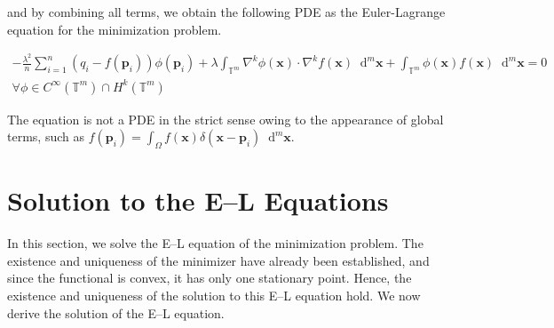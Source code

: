 \documentclass[multixcb]{amstext-l}
\theoremstyle{plain}
\theoremstyle{definition}
\theoremstyle{definition}
\theoremstyle{remark}
\numberwithin{equation}{chapter}
\begin{document}
and by combining all terms, we obtain the following PDE as the Euler-Lagrange equation for the minimization problem.

\begin{equation}\label{eq12}
\begin{aligned}
-\frac{\lambda^2}{n}\sum\limits_{i = 1}^{n}(q_i-f(\boldsymbol{p}_i))\phi(\boldsymbol{p}_i) + \lambda\int_{\mathbb{T}^m}\nabla^k\phi(\boldsymbol{x})\cdot \nabla^k f(\boldsymbol{x}) \mathop{}\!\mathrm{d}^m\boldsymbol{x}+  \int_{\mathbb{T}^m} \phi(\boldsymbol{x}) f(\boldsymbol{x})\mathop{}\!\mathrm{d}^m\boldsymbol{x}  = 0 \\
\forall \phi \in  C^{\infty}(\mathbb{T}^m)\cap H^k(\mathbb{T}^m)
\end{aligned}
\end{equation}
 


The equation is not a PDE in the strict sense owing to the appearance of global terms, such as $f(\boldsymbol{p}_i) = \int_{\Omega} f(\boldsymbol{x})\delta(\boldsymbol{x}-\boldsymbol{p}_i)\mathop{}\!\mathrm{d}^m\boldsymbol{x}$.

\section{Solution to the E--L Equations}

In this section, we solve the E--L equation of the minimization problem. The existence and uniqueness of the minimizer have already been established, and since the functional is convex, it has only one stationary point. Hence, the existence and uniqueness of the solution to this E--L equation hold. We now derive the solution of the E--L equation.
\end{document}
